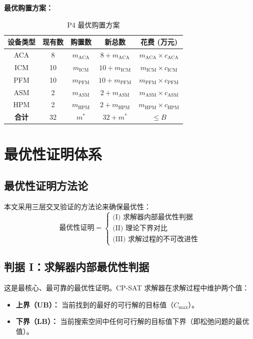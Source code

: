 \documentclass[UTF8,a4paper,12pt]{ctexart}
\begin{document}
\textbf{最优购置方案：}
\begin{table}[htbp]
  \centering
  \caption{P4 最优购置方案}
  \label{tab:p4_optimal_purchase}
  \begin{tabular}{ccccc}
    \toprule
    设备类型 & 现有数 & 购置数 & 新总数 & 花费 (万元) \\
    \midrule
    ACA & 8 & $m_{\text{ACA}}$ & $8+m_{\text{ACA}}$ & $m_{\text{ACA}} \times c_{\text{ACA}}$ \\
    ICM & 10 & $m_{\text{ICM}}$ & $10+m_{\text{ICM}}$ & $m_{\text{ICM}} \times c_{\text{ICM}}$ \\
    PFM & 10 & $m_{\text{PFM}}$ & $10+m_{\text{PFM}}$ & $m_{\text{PFM}} \times c_{\text{PFM}}$ \\
    ASM & 2 & $m_{\text{ASM}}$ & $2+m_{\text{ASM}}$ & $m_{\text{ASM}} \times c_{\text{ASM}}$ \\
    HPM & 2 & $m_{\text{HPM}}$ & $2+m_{\text{HPM}}$ & $m_{\text{HPM}} \times c_{\text{HPM}}$ \\
    \textbf{合计} & 32 & $m^*$ & $32+m^*$ & $\leq B$ \\
    \bottomrule
  \end{tabular}
\end{table}

\section{最优性证明体系}
\subsection{最优性证明方法论}
本文采用三层交叉验证的方法论来确保最优性：
\begin{equation}
\text{最优性证明} = \left\{ \begin{array}{l}
\text{(I) 求解器内部最优性判据} \\
\text{(II) 理论下界对比} \\
\text{(III) 求解过程的不可改进性}
\end{array} \right. \tag{11-1}
\end{equation}

\subsection{判据 I：求解器内部最优性判据}
这是最核心、最可靠的最优性证明。CP-SAT 求解器在求解过程中维护两个值：
\begin{itemize}
  \item \textbf{上界（UB）：} 当前找到的最好的可行解的目标值（$C_{\max}$）。
  \item \textbf{下界（LB）：} 当前搜索空间中任何可行解的目标值下界（即松弛问题的最优值）。
\end{itemize}
\end{document}
